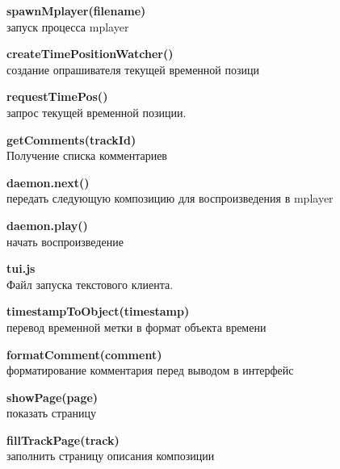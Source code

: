 \begin{itemize}
\begin{item}
    \begin{itemize}
        \begin{item}
          \textbf{spawnMplayer(filename) } \\ запуск процесса mplayer
        \end{item}
        \begin{item}
          \textbf{ createTimePositionWatcher() } 
          \\ создание опрашивателя текущей временной позици
        \end{item}
        \begin{item}
          \textbf{ requestTimePos() } 
          \\ запрос текущей временной позиции. 
        \end{item}
        \begin{item}
          \textbf{getComments(trackId) } \\ Получение списка комментариев
        \end{item}
        \begin{item}
          \textbf{ daemon.next()} 
          \\ передать следующую композицию для воспроизведения в mplayer
        \end{item}
        \begin{item}
          \textbf{ daemon.play()} \\ начать воспроизведение
        \end{item}
    \end{itemize}

  \end{item}
  \begin{item}

    \textbf{tui.js} \\
    Файл запуска текстового клиента. 
    
    \begin{itemize}
        \begin{item}
          \textbf{timestampToObject(timestamp) } \\ перевод временной
          метки в формат объекта времени
        \end{item}
        \begin{item}
          \textbf{ formatComment(comment) } \\ форматирование
          комментария перед выводом в интерфейс
        \end{item}
        \begin{item}
          \textbf{ showPage(page) } \\ показать страницу
        \end{item}
        \begin{item}
          \textbf{ fillTrackPage(track) } \\ заполнить страницу
          описания композиции
        \end{item}
    \end{itemize}

  \end{item}

\end{itemize}

